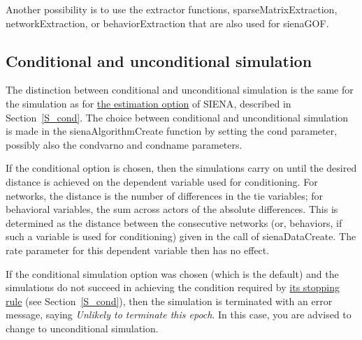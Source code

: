\documentclass[a4paper,fleqn,11pt]{article}
\newcommand{\+}{\, + \,}
\newcommand{\sfn}[1]{\textsf{#1}}
\newcommand{\si}{{\sf SIENA}}
\begin{document}
Another possibility is to use the extractor functions,
\sfn{sparseMatrixExtraction}, \sfn{networkExtraction}, or \sfn{behaviorExtraction}
that are also used for \sfn{sienaGOF}.

\subsection{Conditional and unconditional simulation}
\label{S_conds}

The distinction between conditional and unconditional simulation
is the same for the simulation as for
\hyperlink{T_S_cond}{the estimation option}
of \si, described in Section~\ref{S_cond}.
The choice between conditional and
unconditional simulation is
made in the \textsf{sienaAlgorithmCreate} function by setting the
\textsf{cond} parameter, possibly also the
\textsf{condvarno} and \textsf{condname} parameters.

If the conditional option is chosen, then the simulations
carry on until the desired distance is achieved on the dependent
variable used for conditioning.
For networks, the distance is the number of differences in the
tie variables; for behavioral variables, the sum
across actors of the absolute differences.
This is determined as the
distance between the consecutive networks (or, behaviors,
if such a variable is used for conditioning) given in the call of
\textsf{sienaDataCreate}.
The rate parameter for this dependent variable then
has no effect.

If the conditional simulation option was chosen (which is the
default) and the simulations do not succeed in achieving the
condition required by
\hyperlink{T_distance_stop}{its stopping rule}
(see Section~\ref{S_cond}), then the simulation is
terminated with an error message, saying
\emph{Unlikely to terminate this epoch}.
In this case, you are advised to change to unconditional simulation.
\end{document}
